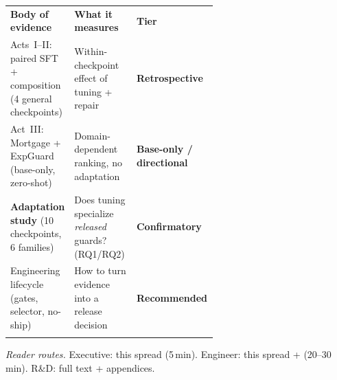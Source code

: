 \begin{table}[H]\centering\footnotesize
\renewcommand{\arraystretch}{1.2}
\begin{tabular}{@{}>{\raggedright\arraybackslash}p{0.30\linewidth} >{\raggedright\arraybackslash}p{0.30\linewidth} l@{}}
\rowcolor{inkgrey}
{\color{white}\bfseries Body of evidence} & {\color{white}\bfseries What it measures} & {\color{white}\bfseries Tier} \\
Acts~I--II: paired SFT + composition (4 general checkpoints) & Within-checkpoint effect of tuning + repair & \textcolor{bgblueedge}{\textbf{Retrospective}} \\
\rowcolor{guidealt} Act~III: Mortgage + ExpGuard (base-only, zero-shot) & Domain-dependent ranking, no adaptation & \textcolor{amberedge}{\textbf{Base-only / directional}} \\
\textbf{Adaptation study} (10 checkpoints, 6 families) & Does tuning specialize \emph{released} guards? (RQ1/RQ2) & \textcolor{tkgreenedge}{\textbf{Confirmatory}} \\
\rowcolor{guidealt} Engineering lifecycle (gates, selector, no-ship) & How to turn evidence into a release decision & \textcolor{inkgrey}{\textbf{Recommended}} \\
\arrayrulecolor{black}\bottomrule
\end{tabular}
\end{table}

\smallskip\noindent\footnotesize\emph{Reader routes.} Executive: this spread (5\,min). Engineer: this spread +  (20--30\,min). R\&D: full text + appendices. \normalsize
